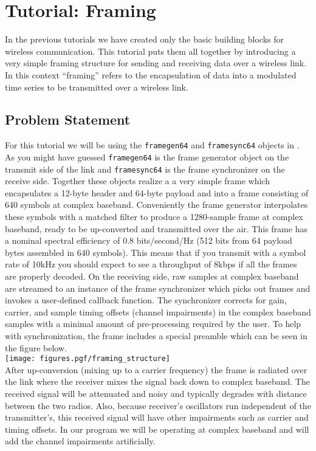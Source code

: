 % 
%

\newpage
\section{Tutorial: Framing}
\label{tutorial:framing}

In the previous tutorials we have created only the basic building blocks
for wireless communication.
This tutorial puts them all together by introducing a very simple
framing structure for sending and receiving data over a wireless link.
In this context ``framing'' refers to the encapsulation of data into a
modulated time series to be transmitted over a wireless link.


%
%
\subsection{Problem Statement}
\label{tutorial:framing:problem}

For this tutorial we will be using the {\tt framegen64} and
{\tt framesync64} objects in \liquid.
As you might have guessed {\tt framegen64} is the frame generator object
on the transmit side of the link
and {\tt framesync64} is the frame synchronizer on the receive side.
%
Together these objects realize a
a very simple frame which encapsulates a 12-byte header and 64-byte
payload and into a frame consisting of 640 symbols at complex baseband.
Conveniently the frame generator interpolates these symbols with a
matched filter to produce a 1280-sample frame at complex baseband,
ready to be up-converted and transmitted over the air.
This frame has a nominal spectral efficiency of 0.8 bits/second/Hz
(512 bits from 64 payload bytes assembled in 640 symbols).
This means that if you transmit with a symbol rate of 10kHz you should
expect to see a throughput of 8kbps if all the frames are properly
decoded.
On the receiving side,
raw samples at complex baseband are streamed to an instance of
the frame synchronizer which picks out frames and invokes a user-defined
callback function.
The synchronizer corrects for gain, carrier, and sample timing offsets
(channel impairments) in the complex baseband samples with a minimal
amount of pre-processing required by the user.
%
To help with synchronization, the frame includes a special preamble
which can be seen in the figure below.\\
%
\texttt{[image: figures.pgf/framing\_structure]}\\
%
After up-conversion (mixing up to a carrier frequency) the frame is
radiated over the link where the receiver mixes the signal back down to
complex baseband.
The received signal will be attenuated and noisy and typically degrades
with distance between the two radios.
Also, because receiver's oscillators run independent of the
transmitter's,
this received signal will have other impairments such as carrier
and timing offsets.
In our program we will be operating at complex baseband and will add the
channel impairments artificially.

